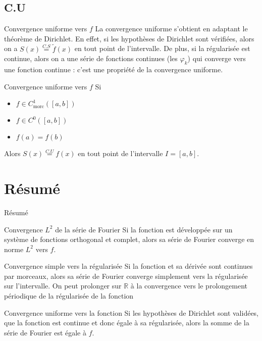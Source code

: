 \documentclass[9pt]{beamer}
\begin{document}
\subsection{C.U}
\begin{frame}{Convergence uniforme vers $f$}
La convergence uniforme s'obtient en adaptant le théorème de Dirichlet. En effet, si les hypothèses de Dirichlet sont vérifiées, alors on a $S(x) \stackrel{C.S}{=} \tilde{f}(x)$ en tout point de l'intervalle. De plus, si la régularisée est continue, alors on a une série de fonctions continues (les $\varphi_k$) qui converge vers une fonction continue : c'est une propriété de la convergence uniforme.
\begin{block}{Convergence uniforme vers $f$}
Si 
\begin{itemize}
\item $f\in C^1 _{\text{morc}}([a,b])$
\item $f\in C^0([a,b])$
\item $f(a)=f(b)$
\end{itemize}
Alors $S(x) \stackrel{C.U}{=}f(x)$ en tout point de l'intervalle $I = [a,b]$.
\end{block}
\end{frame}
\section{Résumé}
\begin{frame}{Résumé}
\begin{block}{Convergence $L^2$ de la série de Fourier}
Si la fonction est développée sur un système de fonctions orthogonal et complet, alors sa série de Fourier converge en norme $L^2$ vers $f$.
\end{block}
\begin{block}{Convergence simple vers la régularisée}
Si la fonction et sa dérivée sont continues par morceaux, alors sa série de Fourier converge simplement vers la régularisée sur l'intervalle. On peut prolonger sur $\mathbb{R}$ à la convergence vers le prolongement périodique de la régularisée de la fonction
\end{block}
\begin{block}{Convergence uniforme vers la fonction}
Si les hypothèses de Dirichlet sont validées, que la fonction est continue et donc égale à sa régularisée, alors la somme de la série de Fourier est égale à $f$.
\end{block}
\end{frame}
\end{document}
